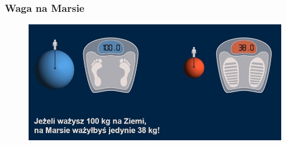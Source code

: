 \documentclass{beamer}
\begin{document}
\begin{frame}
\frametitle{Waga na Marsie}
\begin{figure}[h]
\centering
\includegraphics[width=1\textwidth]{waga.jpg}
\end{figure}
\end{frame}
\end{document}
